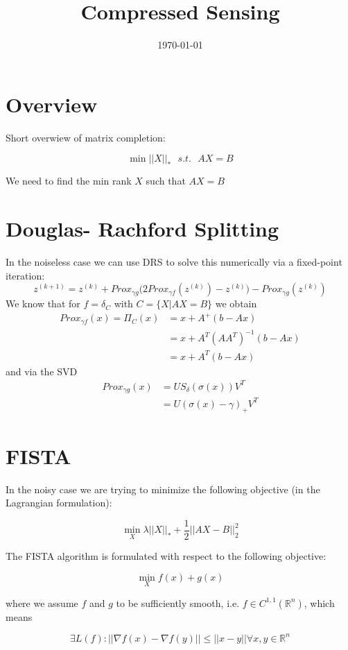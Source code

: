 \documentclass{article}
\title{Compressed Sensing}
\date{\today}
\begin{document}
\maketitle

\section{Overview}

Short overwiew of matrix completion:

$$\min ||X||_* \ \ \ s. t. \ \ \ AX = B$$

We need to find the min rank $X$ such that $AX = B$

\section{Douglas- Rachford Splitting}

In the noiseless case we can use DRS to solve this numerically via a fixed-point iteration: 
$$z^{(k+1)} = z^{(k)} + Prox_{\gamma g}\Big(2 Prox_{\gamma f}(z^{(k)}) - z^{(k)}\Big) - Prox_{\gamma g}(z^{(k)})$$
We know that for $f = \delta_C$ with $C = \lbrace X | AX = B \rbrace$ we obtain
\begin{align*}
Prox_{\gamma f}(x) = \Pi_C(x) &= x + A^+(b-Ax)
\\ &= x + A^T(A A^T)^{-1}(b - Ax)
\\ &= x + A^T(b-Ax)
\end{align*}
and via the SVD
\begin{align*}
Prox_{\gamma g}(x) &= U S_\delta(\sigma(x))V^T
\\ &= U (\sigma(x) - \gamma)_{+} V^T
\end{align*}


\section{FISTA}

In the noisy case we are trying to minimize the following objective (in the Lagrangian formulation):

$$\min_X \lambda||X||_*  + \frac{1}{2} ||AX - B||_2^2$$

The FISTA algorithm is formulated with respect to the following objective:

$$\min_X f(x) + g(x)$$

where we assume $f$ and $g$ to be sufficiently smooth, i.e. $f \in C^{1,1}(\mathbb{R}^n)$, which means

$$\exists L(f) : ||\nabla f(x) - \nabla f(y)|| \leq ||x - y|| \forall x,y \in \mathbb{R}^n$$
\end{document}

